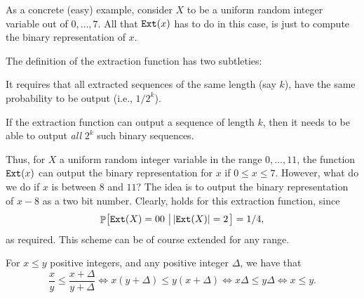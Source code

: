 As a concrete (easy) example, consider $X$ to be a uniform random
integer variable out of $0,\ldots, 7$. All that $\mathtt{E{x}t}(x)$ has
to do in this case, is just to compute the binary representation of
$x$.

The definition of the extraction function has two subtleties:
\begin{compactenumA}
    \item It requires that all extracted sequences of the same length
    (say $k$), have the same probability to be output (i.e., $1/2^k$).

    \item If the extraction function can output a sequence of length
    $k$, then it needs to be able to output \emph{all} $2^k$ such
    binary sequences.
\end{compactenumA}
\smallskip%

Thus, for $X$ a uniform random integer variable in the range
$0,\ldots, 11$, the function $\mathtt{E{x}t}(x)$ can output the binary
representation for $x$ if $0 \leq x \leq 7$. However, what do we do if
$x$ is between $8$ and $11$? The idea is to output the binary
representation of $x -8$ as a two bit number. Clearly,
 holds for this extraction function, since
\[
\Prob{\ExtractFunc(X) = 00 \sep{ \cardin{\ExtractFunc(X)} = 2}} =
{1}/{4},
\]
as required. This scheme can be of course extended for any range.

\begin{tedium}
    For $x \leq y$ positive integers, and any positive integer
    $\Delta$, we have that
    \begin{equation*}
        \frac{x}{y}
        \leq%
        \frac{x + \Delta}{y+\Delta}
        \iff
        x( y+ \Delta) \leq y(x+\Delta)
        \iff
        x \Delta \leq y\Delta
        \iff
        x \leq y.
    \end{equation*}
\end{tedium}

